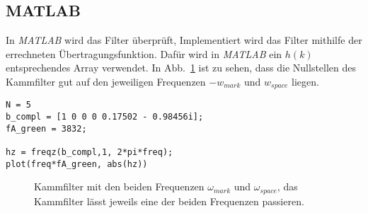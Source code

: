 \documentclass{article}
\begin{document}
\subsection{MATLAB}
In \textit{MATLAB} wird das Filter überprüft, Implementiert wird das Filter mithilfe der errechneten Übertragungsfunktion.
Dafür wird in \textit{MATLAB} ein $h(k)$ entsprechendes Array verwendet. In Abb.~\ref{fig:comb} ist zu sehen,
dass die Nullstellen des Kammfilter gut auf den jeweiligen Frequenzen $- w_{mark}$ und $w_{space}$ liegen.

\begin{listing}
   \label{codeM:comb}
  \caption{In MATLAB wird Überprüft ob die Berechnung des $N$ korrekt sind, indem das Filter mit den Frequenzen
 $w_{mark}$ und $w_{space}$ geplottet wird, siehe Abb.~\ref{fig:comb}. Es wird kontrolliert ob die Nullstellen in den richten Punkten auf der Frequenzachse liegen.}
\begin{verbatim}
N = 5
b_compl = [1 0 0 0 0.17502 - 0.98456i];
fA_green = 3832;

hz = freqz(b_compl,1, 2*pi*freq);
plot(freq*fA_green, abs(hz))

\end{verbatim}
\end{listing}

\begin{figure}[!h]
    \label{fig:comb}
    \centering
 
    \def\svgwidth{1.2\columnwidth}
    \caption{Kammfilter mit den beiden Frequenzen $\omega_{mark}$ und $\omega_{space}$, das Kammfilter lässt jeweils eine der beiden Frequenzen passieren.}
\end{figure}
\end{document}
